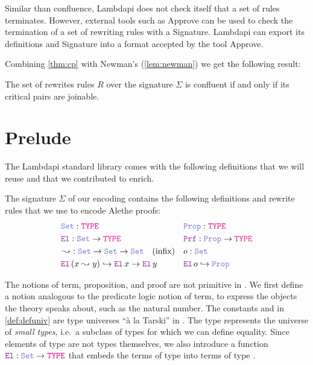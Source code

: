 \begin{remark}
Similar than confluence, Lambdapi does not check itself that a set of rules terminates.
However, external tools such as Approve \cite{aprove} can be used to check the termination of a set of rewriting rules with a Signature.
Lambdapi can export its definitions and Signature into a format accepted by the tool Approve.
\end{remark}

Combining \cref{thm:cp} with Newman's (\cref{lem:newman}) we get the following result:

\begin{corollary}
The set of rewrites rules $R$ over the signature $\Sigma$ is confluent if and only if its critical pairs are joinable.
\end{corollary}

\section{Prelude}
\label{sec:prelude-lp}

The Lambdapi standard library comes with the following definitions that we will reuse and that we contributed to enrich.

\begin{definition}
\label{def:defuniv}
The signature $\Sigma$ of our encoding contains the following definitions and rewrite rules that we use to encode Alethe proofs:
\begin{align*}
&\set\index{\set}: \type & &\prop\index{\prop}: \type \\
&\index{\el{}} \el{}: \set \rightarrow \type  & &\index{\prf}\prf{} : \prop \rightarrow \type \\
&\mathop{\leadsto}\index{$\leadsto$}: \set \rightarrow \set \rightarrow \set \quad \text{(infix)} & &o: \set \\
&\el\,(x \leadsto y) \hookrightarrow \el\,x \rightarrow \el\,y & &\el\,o\index{o}  \hookrightarrow \prop
\end{align*}
\end{definition}

The notions of term, proposition, and proof are not primitive in \lpm.
We ﬁrst deﬁne a notion analogous to the predicate logic notion of term, to express the objects the theory speaks about, such as the natural number.
The constants \set{} and \prop{} in \cref{def:defuniv} are type universes ``à la Tarski'' \cite[\S Universes]{intuitype} in \lpm.
The type \set{} represents the universe of \textit{small types}, i.e.\ a subclass of types for which we can define equality.
Since elements of type \set{} are not types themselves,
we also introduce a function $\el: \set \rightarrow \type$ that embeds the terms of type \set{} into terms of type \type.


